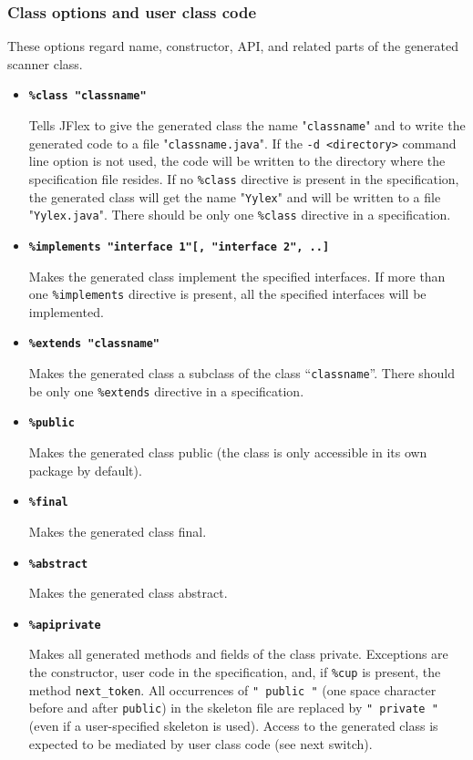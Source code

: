 \documentclass[11pt]{scrartcl}
\begin{document}
\subsubsection{Class options and user class code}\label{ClassOptions}
These options regard name, constructor, API, and related parts of the
generated scanner class.
\begin{itemize}
\item
\textbf{\texttt{\%class "classname"}}

Tells JFlex to give the generated class the name "\texttt{classname}" and to
write the generated code to a file "\texttt{classname.java}". If the 
\texttt{-d <directory>} command line option is not used, the code
will be written to the directory where the specification file resides. If
no \texttt{\%class} directive is present in the specification, the generated
class will get the name "\texttt{Yylex}" and will be written to a file
"\texttt{Yylex.java}". There should be only one \texttt{\%class} directive
in a specification.
 
\item
\textbf{\texttt{\%implements "interface 1"[, "interface 2", ..]}}

Makes the generated class implement the specified interfaces. If more than
one \texttt{\%imple\-ments} directive is present, all the specified interfaces 
will be implemented.
 
\item
\textbf{\texttt{\%extends "classname"}}

Makes the generated class a subclass of the class ``\texttt{classname}''.
There should be only one \texttt{\%extends} directive in a specification.

\item
\textbf{\texttt{\%public}}

Makes the generated class public (the class is only accessible in its
own package by default).

\item
\textbf{\texttt{\%final}}

Makes the generated class final.

\item
\textbf{\texttt{\%abstract}}

Makes the generated class abstract.
 
\item
\textbf{\texttt{\%apiprivate}}

Makes all generated methods and fields of the class
private. Exceptions are the constructor, user code in the
specification, and, if \verb+%cup+ is present, the method
\texttt{next\_token}. All occurrences of
\texttt{" public "} (one space character before and after \texttt{public})
in the skeleton file are replaced by
\texttt{" private "} (even if a user-specified skeleton is used).
Access to the generated class is expected to be mediated by user class
code (see next switch).



\end{itemize}
\end{document}
